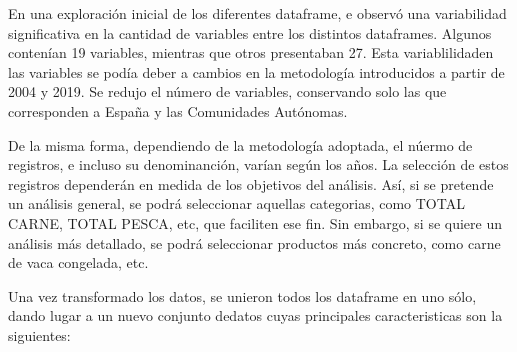 \documentclass[
]{article}
\begin{document}
En una exploración inicial de los diferentes dataframe, e observó una
variabilidad significativa en la cantidad de variables entre los
distintos dataframes. Algunos contenían 19 variables, mientras que otros
presentaban 27. Esta variablilidaden las variables se podía deber a
cambios en la metodología introducidos a partir de 2004 y 2019. Se
redujo el número de variables, conservando solo las que corresponden a
España y las Comunidades Autónomas.

De la misma forma, dependiendo de la metodología adoptada, el núermo de
registros, e incluso su denominanción, varían según los años. La
selección de estos registros dependerán en medida de los objetivos del
análisis. Así, si se pretende un análisis general, se podrá seleccionar
aquellas categorias, como TOTAL CARNE, TOTAL PESCA, etc, que faciliten
ese fin. Sin embargo, si se quiere un análisis más detallado, se podrá
seleccionar productos más concreto, como carne de vaca congelada, etc.

Una vez transformado los datos, se unieron todos los dataframe en uno
sólo, dando lugar a un nuevo conjunto dedatos cuyas principales
caracteristicas son la siguientes:
\end{document}
